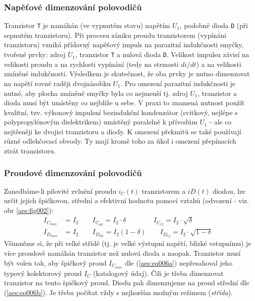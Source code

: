       \subsubsection{Napěťové dimenzování polovodičů}
        Tranzistor \texttt{T} je namáhán (ve vypnutém stavu) napětím \(U_1\), podobně dioda 
        \texttt{D} (při sepnutém tranzistoru). Při procesu zániku proudu tranzistorem (vypínání 
        tranzistoru) vzniká přídavný napěťový impuls na parazitní indukčnosti smyčky, tvořené 
        prvky: zdroj \(U_1\), tranzistor \texttt{T} a nulová dioda \texttt{D}. Velikost impulsu 
        závisí na velikosti proudu a na rychlosti vypínání (tedy na strmosti \(di/dt\)) a na
        velikosti zmíněné indukčnosti. Výsledkem je skutečnost, že oba prvky je nutno dimenzovat na 
        napětí rovné raději dvojnásobku \(U_1\). Pro omezení parazitní indukčnosti je nutné, aby 
        plocha zmíněné smyčky byla co nejmenší tj. zdroj \(U_1\), tranzistor a dioda musí být 
        umístěny co nejblíže u sebe. V praxi to znamená nutnost použít kvalitní, tzv. výkonový 
        impulsní bezindukční kondenzátor (svitkový, nejlépe s polypropylénovým dielektrikem) 
        umístěný paralelně k přívodům \(U_1\) - ale co nejtěsněji ke dvojici tranzistoru a diody.
        K omezení překmitů se také používají různé odlehčovací obvody. Ty mají kromě toho za úkol i
        omezení přepínacích ztrát tranzistoru.

      \subsubsection{Proudové dimenzování polovodičů}
        Zanedbáme-li pilovité zvlnění proudu \(i_C(t)\) tranzistorem a \(iD(t)\) diodou, lze určit 
        jejich špičkovou, střední a efektivní hodnotu pomocí vztahů (odvození - viz. obr  
        \ref{aes:fig002}):
        \begin{align}
          I_{C_{max}} &= I_2  \qquad  I_{C_{\text{stř}}} = I_2\cdot\delta    \qquad\qquad
                                I_{C_{ef}} = I_2\cdot\sqrt{\delta}       \label{aes:eq006a}   \\
          I_{D_{max}} &= I_2  \qquad  I_{D_{\text{stř}}} = I_2(1-\delta)     \qquad
                                I_{D_{ef}} = I_2\cdot\sqrt{1-\delta}     \label{aes:eq006b}
        \end{align}
        Všimněme si, že při velké střídě (tj. je velké výstupní napětí, blízké vstupnímu) je více 
        proudově namáhán tranzistor než nulová dioda a naopak. Tranzistor musí být volen tak, aby 
        špičkový proud \(I_{C_{max}}\) dle (\ref{aes:eq006a}) nepřesahoval jeho typový kolektorový 
        proud \(I_C\) (katalogový údaj). Čili je třeba dimenzovat tranzistor na tento špičkový 
        proud. Diodu pak dimenzujeme na proud střední dle (\ref{aes:eq006b}). Je třeba počítat vždy 
        s nejhorším možným režimem (\emph{střída}).
        
